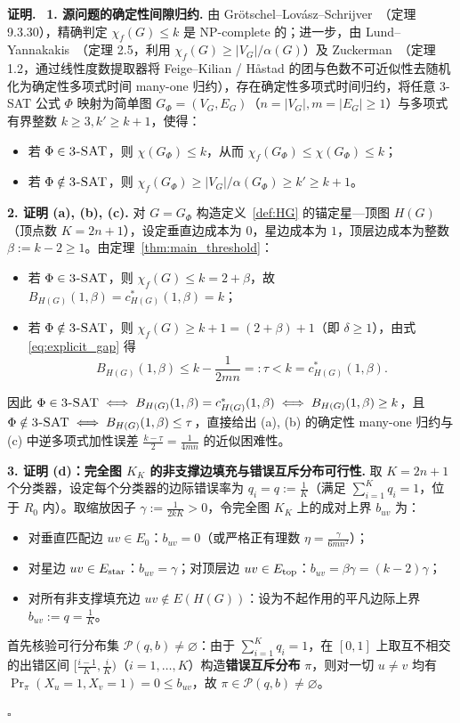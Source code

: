 \documentclass[11pt,a4paper]{ctexart}
\theoremstyle{definition}
\newenvironment{proofcn}{\par\noindent\textbf{证明.}\ }{\hfill$\square$\par}
\newcommand{\1}{\boldsymbol 1}
\newcommand{\0}{\boldsymbol 0}
\newcommand{\chif}{\chi_f}
\begin{document}
\begin{proofcn}
\textbf{1. 源问题的确定性间隙归约.}
由 Gr\"otschel--Lov\'asz--Schrijver~\cite{GLS1981,GLS1988}（定理 9.3.30），精确判定 $\chif(G)\le k$ 是 NP-complete 的；进一步，由 Lund--Yannakakis~\cite{LundYannakakis1994}（定理 2.5，利用 $\chif(G)\ge |V_G|/\alpha(G)$）及 Zuckerman~\cite{Zuckerman2007}（定理 1.2，通过线性度数提取器将 Feige--Kilian / H\aa stad 的团与色数不可近似性去随机化为确定性多项式时间 many-one 归约），存在确定性多项式时间归约，将任意 \textsc{3-SAT} 公式 $\Phi$ 映射为简单图 $G_\Phi=(V_G,E_G)$（$n=|V_G|,m=|E_G|\ge 1$）与多项式有界整数 $k\ge 3, k'\ge k+1$，使得：
\begin{itemize}
\item 若 $\Phi\in\textsc{3-SAT}$，则 $\chi(G_\Phi)\le k$，从而 $\chif(G_\Phi)\le \chi(G_\Phi)\le k$；
\item 若 $\Phi\notin\textsc{3-SAT}$，则 $\chif(G_\Phi)\ge |V_G|/\alpha(G_\Phi)\ge k'\ge k+1$。
\end{itemize}

\textbf{2. 证明 (a), (b), (c).}
对 $G=G_\Phi$ 构造定义~\ref{def:HG} 的锚定星—顶图 $H(G)$（顶点数 $K=2n+1$），设定垂直边成本为 $0$，星边成本为 $1$，顶层边成本为整数 $\beta:=k-2\ge 1$。由定理~\ref{thm:main_threshold}：
\begin{itemize}
\item 若 $\Phi\in\textsc{3-SAT}$，则 $\chif(G)\le k=2+\beta$，故 $B_{H(G)}(1,\beta)=c_{H(G)}^*(1,\beta)=k$；
\item 若 $\Phi\notin\textsc{3-SAT}$，则 $\chif(G)\ge k+1=(2+\beta)+1$（即 $\delta\ge 1$），由式 \eqref{eq:explicit_gap} 得
\[
 B_{H(G)}(1,\beta) \le k - \frac{1}{2mn} =: \tau < k = c_{H(G)}^*(1,\beta).
\]
\end{itemize}
因此 $\Phi\in\textsc{3-SAT}\iff B_{H(G)}(1,\beta)=c_{H(G)}^*(1,\beta)\iff B_{H(G)}(1,\beta)\ge k$，且 $\Phi\notin\textsc{3-SAT}\iff B_{H(G)}(1,\beta)\le\tau$，直接给出 (a), (b) 的确定性 many-one 归约与 (c) 中逆多项式加性误差 $\frac{k-\tau}{2}=\frac{1}{4mn}$ 的近似困难性。

\textbf{3. 证明 (d)：完全图 $K_K$ 的非支撑边填充与错误互斥分布可行性.}
取 $K=2n+1$ 个分类器，设定每个分类器的边际错误率为 $q_i=q:=\frac{1}{K}$（满足 $\sum_{i=1}^K q_i=1$，位于 $R_0$ 内）。取缩放因子 $\gamma:=\frac{1}{2kK}>0$，令完全图 $K_K$ 上的成对上界 $b_{uv}$ 为：
\begin{itemize}
\item 对垂直匹配边 $uv\in E_0$：$b_{uv}=0$（或严格正有理数 $\eta=\frac{\gamma}{6mn^2}$）；
\item 对星边 $uv\in E_{\rm star}$：$b_{uv}=\gamma$；对顶层边 $uv\in E_{\rm top}$：$b_{uv}=\beta\gamma=(k-2)\gamma$；
\item 对所有非支撑填充边 $uv\notin E(H(G))$：设为不起作用的平凡边际上界 $b_{uv}:=q=\frac{1}{K}$。
\end{itemize}
首先核验可行分布集 $\mathcal P(q,b)\neq\varnothing$：由于 $\sum_{i=1}^K q_i=1$，在 $[0,1]$ 上取互不相交的出错区间 $\bigl[\frac{i-1}{K},\frac{i}{K}\bigr)$（$i=1,\dots,K$）构造\textbf{错误互斥分布} $\pi$，则对一切 $u\neq v$ 均有 $\Pr_\pi(X_u=1,X_v=1)=0\le b_{uv}$，故 $\pi\in\mathcal P(q,b)\neq\varnothing$。


\end{proofcn}
\end{document}
